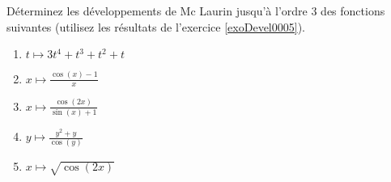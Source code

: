 
\begin{exercice}\label{exoDevel0006}

Déterminez les développements de Mc Laurin jusqu'à l'ordre 3 des fonctions suivantes (utilisez les résultats de l'exercice \ref{exoDevel0005}).
\begin{multicols}{2}
\begin{enumerate}
	\item $ t \mapsto 3t^4 + t^3 + t^2 + t $
	\item $ x \mapsto \frac{\cos(x)-1}{x} $
	\item $ x \mapsto \frac{\cos(2x)}{\sin(x)+1} $
	\item $ y \mapsto \frac{y^2+y}{\cos(y)} $
	\item $ x \mapsto  \sqrt{\cos(2x)} $
\end{enumerate}
\end{multicols}

\end{exercice}
